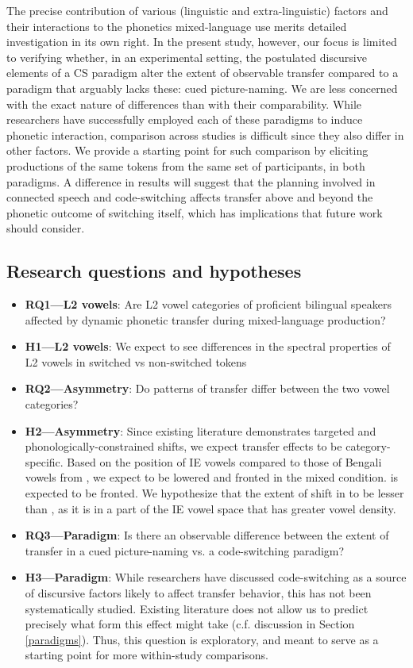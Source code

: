 \documentclass[12 pt]{article}
\newcommand{\nt}[1]{\textipa{[#1]}} %
\begin{document}
The precise contribution of various (linguistic and extra-linguistic) factors and their interactions to the phonetics mixed-language use merits detailed investigation in its own right. In the present study, however, our focus is limited to verifying whether, in an experimental setting, the postulated discursive elements of a CS paradigm alter the extent of observable transfer compared to a paradigm that arguably lacks these: cued picture-naming. We are less concerned with the exact nature of differences than with their comparability. While researchers have successfully employed each of these paradigms to induce phonetic interaction, comparison across studies is difficult since they also differ in other factors. We provide a starting point for such comparison by eliciting productions of the same tokens from the same set of participants, in both paradigms. A difference in results will suggest that the planning involved in connected speech and code-switching affects transfer above and beyond the phonetic outcome of switching itself, which has implications that future work should consider. 


\subsection*{Research questions and hypotheses}\label{questions_and_hypotheses}
\begin{itemize}
	\item \textbf{RQ1---L2 vowels}: Are L2 vowel categories of proficient bilingual speakers affected by dynamic phonetic transfer during mixed-language production?
	\item \textbf{H1---L2 vowels}: We expect to see differences in the spectral properties of L2 vowels in switched vs non-switched tokens
	\item \textbf{RQ2---Asymmetry}: Do patterns of transfer differ between the two vowel categories?
	\item \textbf{H2---Asymmetry}: Since existing literature demonstrates targeted and phonologically-constrained shifts, we expect transfer effects to be category-specific. Based on the position of IE vowels compared to those of Bengali vowels from \cite{shruticorpus}, we expect \nt{2} to be lowered and fronted in the mixed condition. \nt{\ae} is expected to be fronted. We hypothesize that the extent of shift in \nt{\ae} to be lesser than \nt{2}, as it is in a part of the IE vowel space that has greater vowel density.
	\item \textbf{RQ3---Paradigm}: Is there an observable difference between the extent of transfer in a cued picture-naming vs. a code-switching paradigm? 
	\item \textbf{H3---Paradigm}: While researchers have discussed code-switching as a source of discursive factors likely to affect transfer behavior, this has not been systematically studied. Existing literature does not allow us to predict precisely what form this effect might take (c.f. discussion in Section \ref{paradigms}). Thus, this question is exploratory, and meant to serve as a starting point for more within-study comparisons. 
\end{itemize}
\end{document}
